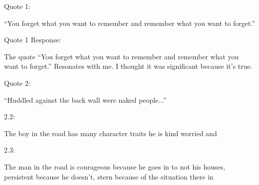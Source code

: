 
 Quote 1:

“You forget what you want to remember and remember what you want to forget.” 

Quote 1 Response: 

The quote “You forget what you want to remember and remember what you want to forget.” Resonates with me. I thought it was significant because it’s true. 

Quote 2: 

“Huddled against the back wall were naked people...” 

2.2: 

The boy in the road has many character traits he is kind worried and  

2.3: 

The man in the road is courageous because he goes in to not his houses, persistent because he doesn’t, stern because of the situation there in 

